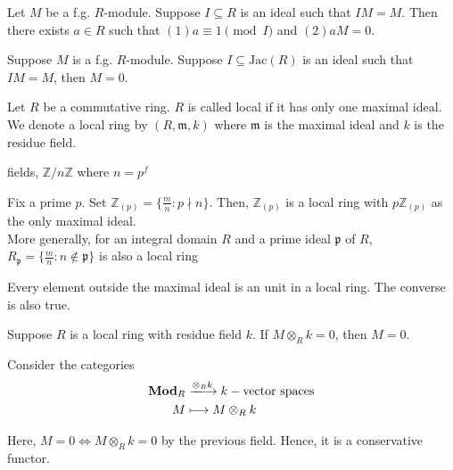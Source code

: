 \documentclass[oneside, 12pt]{scrbook}
\newcommand{\ZZ}{\mathbb Z}
\newcommand{\pr}{\mathfrak{p}}
\newcommand{\m}{\mathfrak{m}}
\theoremstyle{theorem}
\begin{document}
\begin{corollary}
Let $M$ be a f.g. $R$-module. Suppose $I \subseteq R$ is an ideal such that $IM=M$. Then there exists $a\in R$ such that $(1) a\equiv 1 \pmod{I}$ and $(2) aM=0$.
\end{corollary}

\begin{lemma}
Suppose $M$ is a f.g. $R$-module. Suppose $I \subseteq \mathrm{Jac}(R)$ is an ideal such that $IM=M$, then $M=0$.
\end{lemma}

\begin{definition}
Let $R$ be a commutative ring. $R$ is called local if it has only one maximal ideal. We denote a local ring by $(R, \m , k)$ where $\m$ is the maximal ideal and $k$ is the residue field.
\end{definition}

\begin{example}
fields, $\ZZ/n\ZZ$ where $n  = p^f$
\end{example}

\begin{example}
Fix a prime $p$. Set $\ZZ_{(p)} = \{\frac{m}{n}: p \nmid n\}$. Then, $\ZZ_{(p)}$ is a local ring with $p \ZZ_{(p)}$ as the only maximal ideal. \\

More generally, for an integral domain $R$ and a prime ideal $\pr$ of $R$, $R_{\pr} = \{\frac{m}{n}: n \not \in \pr\}$ is also a local ring 
\end{example}

\begin{remark}
Every element outside the maximal ideal is an unit in a local ring. The converse is also true. 
\end{remark}

\begin{corollary}
Suppose $R$ is a local ring with residue field $k$. If $M \otimes_{R} k = 0$, then $M=0$.
\end{corollary}

Consider the categories 
\begin{align*}
\mathbf{Mod}_{R} &\xlongrightarrow{\otimes_{R} k} k-\text{vector spaces}\\
M &\longmapsto M \otimes_{R} k 
\end{align*}

Here, $M = 0 \Leftrightarrow M \otimes_{R} k = 0$ by the previous field. Hence, it is a conservative functor. 
\end{document}
